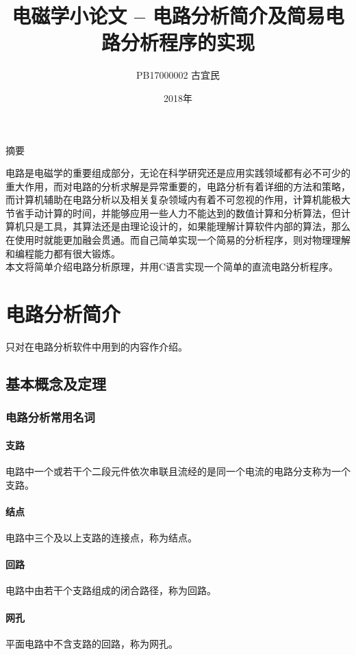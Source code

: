 \documentclass[UTF-8,cs4size]{ctexart}
\title{电磁学小论文 -- 电路分析简介及简易电路分析程序的实现}
\author{PB17000002  古宜民}
\date{2018年}
\begin{document}
 \normalsize
\maketitle
\begin{center}
	摘要
\end{center}

电路是电磁学的重要组成部分，无论在科学研究还是应用实践领域都有必不可少的重大作用，而对电路的分析求解是异常重要的，电路分析有着详细的方法和策略，而计算机辅助在电路分析以及相关复杂领域内有着不可忽视的作用，计算机能极大节省手动计算的时间，并能够应用一些人力不能达到的数值计算和分析算法，但计算机只是工具，其算法还是由理论设计的，如果能理解计算软件内部的算法，那么在使用时就能更加融会贯通。而自己简单实现一个简易的分析程序，则对物理理解和编程能力都有很大锻炼。 \\
本文将简单介绍电路分析原理，并用C语言实现一个简单的直流电路分析程序。
\clearpage
\section{电路分析简介}
只对在电路分析软件中用到的内容作介绍。 \\
\subsection{基本概念及定理}
\subsubsection{电路分析常用名词}
\paragraph{支路} 电路中一个或若干个二段元件依次串联且流经的是同一个电流的电路分支称为一个支路。
\paragraph{结点} 电路中三个及以上支路的连接点，称为结点。
\paragraph{回路} 电路中由若干个支路组成的闭合路径，称为回路。
\paragraph{网孔} 平面电路中不含支路的回路，称为网孔。
\end{document}
